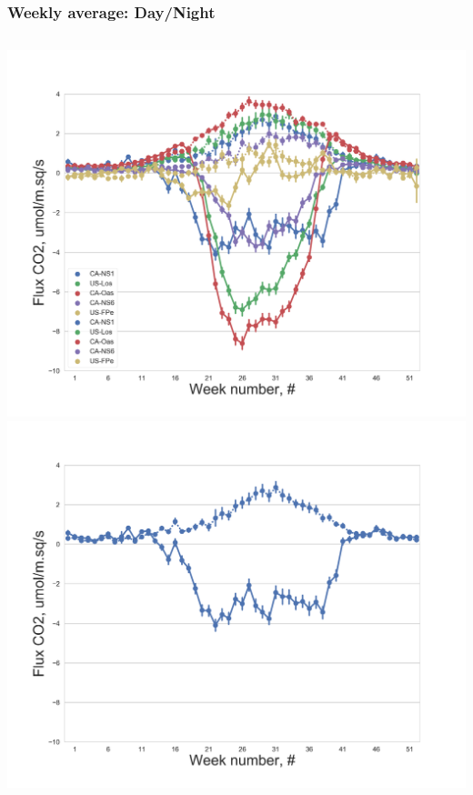 \documentclass{beamer}
\begin{document}
\begin{frame}
\frametitle{Weekly average: Day/Night}

\begin{columns}[t]
\centering
\includegraphics[width=\textwidth]{FvsW_day/all.png}\\
\includegraphics[width=\textwidth]{FvsW_day/CA-NS1.png}
\centering

\end{columns}
\end{frame}
\end{document}
